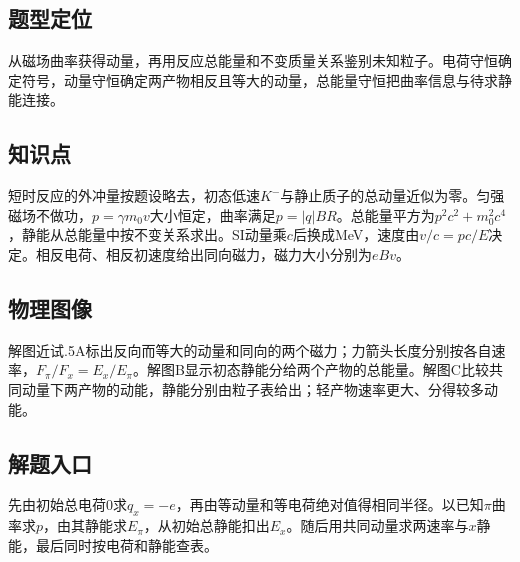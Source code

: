 \documentclass[UTF8,fontset=fandol,a4paper,11pt]{ctexart}
\begin{document}


\subsection*{题型定位}

从磁场曲率获得动量，再用反应总能量和不变质量关系鉴别未知粒子。电荷守恒确定符号，动量守恒确定两产物相反且等大的动量，总能量守恒把曲率信息与待求静能连接。



\subsection*{知识点}

短时反应的外冲量按题设略去，初态低速$K^-$与静止质子的总动量近似为零。匀强磁场不做功，$p=\gamma m_0v$大小恒定，曲率满足$p=|q|BR$。总能量平方为$p^2c^2+m_0^2c^4$，静能从总能量中按不变关系求出。SI动量乘$c$后换成MeV，速度由$v/c=pc/E$决定。相反电荷、相反初速度给出同向磁力，磁力大小分别为$eBv$。



\subsection*{物理图像}

解图近试.5A标出反向而等大的动量和同向的两个磁力；力箭头长度分别按各自速率，$F_\pi/F_x=E_x/E_\pi$。解图B显示初态静能分给两个产物的总能量。解图C比较共同动量下两产物的动能，静能分别由粒子表给出；轻产物速率更大、分得较多动能。



\subsection*{解题入口}

先由初始总电荷0求$q_x=-e$，再由等动量和等电荷绝对值得相同半径。以已知$\pi$曲率求$p$，由其静能求$E_\pi$，从初始总静能扣出$E_x$。随后用共同动量求两速率与$x$静能，最后同时按电荷和静能查表。


\end{document}
